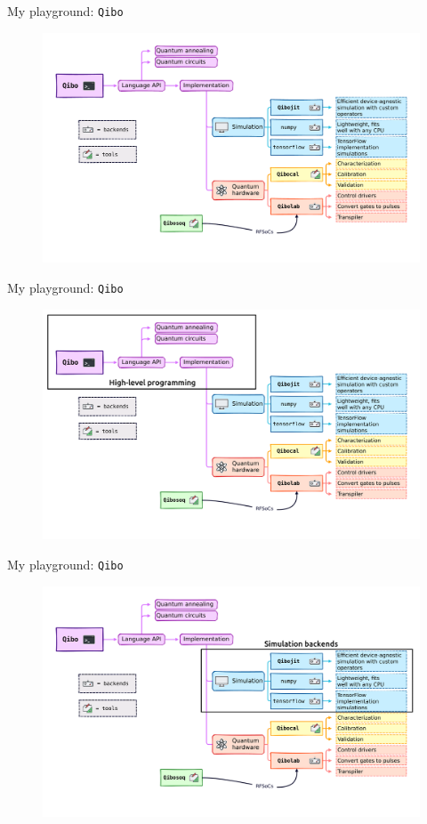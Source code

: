 \documentclass[8pt, xcolor={svgnames}, hyperref={linkcolor=black}]{beamer}
\begin{document}
\begin{frame}{My playground: \texttt{Qibo}}
\begin{figure}  
   \includegraphics[width=1\textwidth]{figures/qibo_ecosystem.pdf}
\end{figure}
\end{frame}

\begin{frame}{My playground: \texttt{Qibo}}
\begin{figure}  
   \includegraphics[width=1\textwidth]{figures/eco1.png}
\end{figure}
\end{frame}

\begin{frame}{My playground: \texttt{Qibo}}
\begin{figure}  
   \includegraphics[width=1\textwidth]{figures/eco2.png}
\end{figure}
\end{frame}
\end{document}
